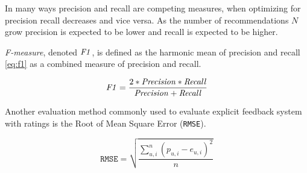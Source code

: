 In many ways precision and recall are competing measures, when optimizing for precision recall decreases and vice versa.  As the number of recommendations $N$ grow precision is expected to be lower and recall is expected to be higher. \citep{hu2008collaborative}


\textit{F-measure}, denoted $\mathit{F1}$, is defined as the harmonic mean of precision and recall \eqref{eq:f1} as a combined measure of precision and recall.

\begin{equation} \label{eq:f1}
    \mathit{F1} = \frac{2 * \mathit{Precision} * \mathit{Recall}}{\mathit{Precision} + \mathit{Recall}}
\end{equation}


Another evaluation method commonly used to evaluate explicit feedback system with ratings is the Root of Mean Square Error (\texttt{RMSE}).
\citep{bobadilla2013recommender}

\begin{equation} \label{eq:rmse}
    \mathtt{RMSE} = \sqrt{\frac{\sum_{u, i}^n (p_{u, i} - e_{u, i})^2}{n}}
\end{equation}

